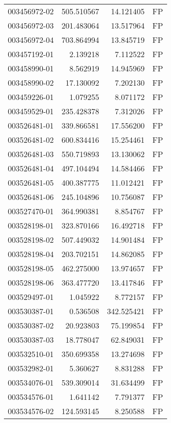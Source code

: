 \begin{tabular}{lrrl}
003456972-02 &  505.510567 &    14.121405 &   FP \\
003456972-03 &  201.483064 &    13.517964 &   FP \\
003456972-04 &  703.864994 &    13.845719 &   FP \\
003457192-01 &    2.139218 &     7.112522 &   FP \\
003458990-01 &    8.562919 &    14.945969 &   FP \\
003458990-02 &   17.130092 &     7.202130 &   FP \\
003459226-01 &    1.079255 &     8.071172 &   FP \\
003459529-01 &  235.428378 &     7.312026 &   FP \\
003526481-01 &  339.866581 &    17.556200 &   FP \\
003526481-02 &  600.834416 &    15.254461 &   FP \\
003526481-03 &  550.719893 &    13.130062 &   FP \\
003526481-04 &  497.104494 &    14.584466 &   FP \\
003526481-05 &  400.387775 &    11.012421 &   FP \\
003526481-06 &  245.104896 &    10.756087 &   FP \\
003527470-01 &  364.990381 &     8.854767 &   FP \\
003528198-01 &  323.870166 &    16.492718 &   FP \\
003528198-02 &  507.449032 &    14.901484 &   FP \\
003528198-04 &  203.702151 &    14.862085 &   FP \\
003528198-05 &  462.275000 &    13.974657 &   FP \\
003528198-06 &  363.477720 &    13.417846 &   FP \\
003529497-01 &    1.045922 &     8.772157 &   FP \\
003530387-01 &    0.536508 &   342.525421 &   FP \\
003530387-02 &   20.923803 &    75.199854 &   FP \\
003530387-03 &   18.778047 &    62.849031 &   FP \\
003532510-01 &  350.699358 &    13.274698 &   FP \\
003532982-01 &    5.360627 &     8.831288 &   FP \\
003534076-01 &  539.309014 &    31.634499 &   FP \\
003534576-01 &    1.641142 &     7.791377 &   FP \\
003534576-02 &  124.593145 &     8.250588 &   FP \\

\end{tabular}
